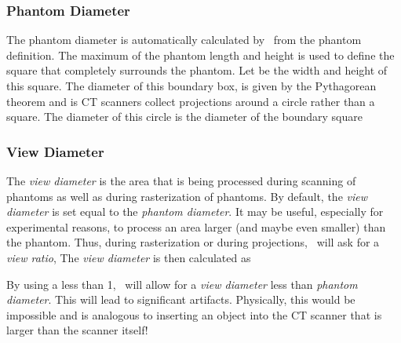\subsubsection{Phantom Diameter}
The phantom diameter is automatically calculated by \ctsim\ from
the phantom definition. The maximum of the phantom length and
height is used to define the square that completely surrounds the
phantom. Let  be the width
and height of this square. The diameter of this boundary box,
 is given by the
Pythagorean theorem and is
CT scanners collect projections around a
circle rather than a square. The diameter of this circle is
the diameter of the boundary square 
\begin{figure}
\centerline{}
\end{figure}

\subsubsection{View Diameter}
The \emph{view diameter} is the area that is being processed
during scanning of phantoms as well as during rasterization of
phantoms. By default, the \emph{view diameter} is set equal
to the \emph{phantom diameter}. It may be useful, especially for
experimental reasons, to process an area larger (and maybe even
smaller) than the phantom. Thus, during rasterization or during
projections, \ctsim\ will ask for a \emph{view ratio},
 The \emph{view
diameter} is then calculated as

By using a
less than 1, \ctsim\ will allow
for a \emph{view diameter} less than
\emph{phantom diameter}.
This will lead to significant artifacts. Physically, this would
be impossible and is analogous to inserting an object into the CT
scanner that is larger than the scanner itself!

